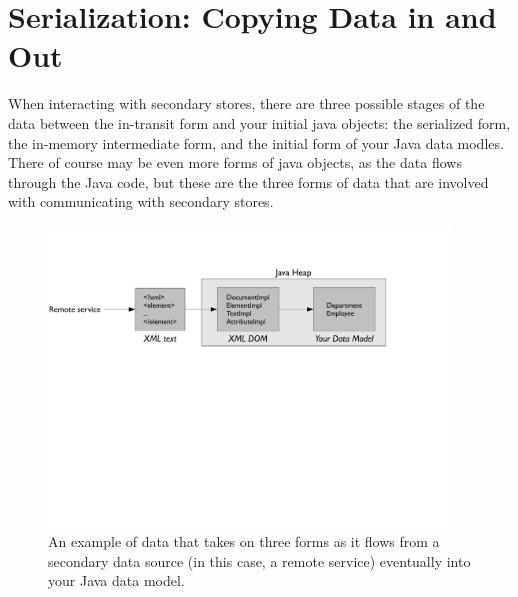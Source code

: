 \section{Serialization: Copying Data in and Out}

When interacting with secondary stores, there are three possible stages of the
data between the in-transit form and your initial java objects: the serialized
form, the in-memory intermediate form, and the initial form of your Java data
modles. There of course may be even more forms of java objects, as the data
flows through the Java code, but these are the three forms of data that are
involved with communicating with secondary stores.

\begin{figure}
\centering
  \includegraphics[width=0.95\textwidth]{part3/Figures/secondary/serializationforms}
  \caption{An example of data that takes on three forms as it flows from a
  secondary data source (in this case, a remote service) eventually into your
  Java data model.}
\end{figure}

